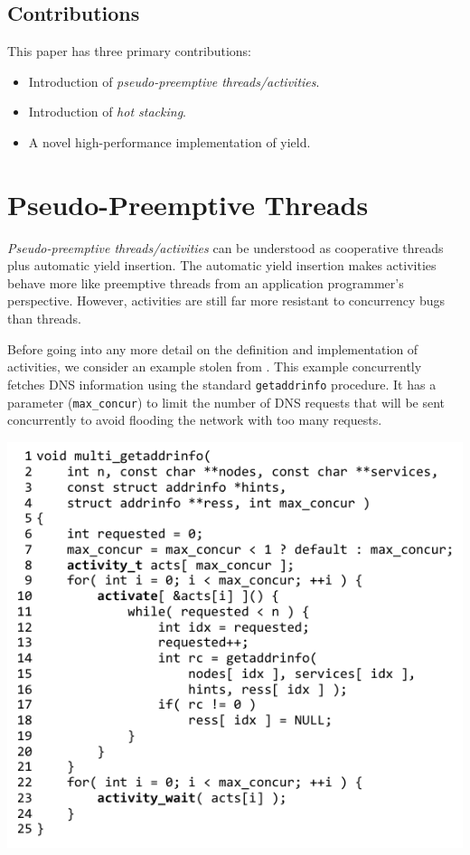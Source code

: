 \documentclass[10pt,preprint]{sigplanconf}
\begin{document}

\subsection{Contributions}

This paper has three primary contributions:

\begin{itemize}
\item Introduction of \emph{pseudo-preemptive threads/activities}.
\item Introduction of \emph{hot stacking}.
\item A novel high-performance implementation of yield.
\end{itemize}

\section{Pseudo-Preemptive Threads}

\emph{Pseudo-preemptive threads\slash activities} can be understood as cooperative threads plus automatic yield insertion.
The automatic yield insertion makes activities behave more like preemptive threads from an application programmer's perspective.
However, activities are still far more resistant to concurrency bugs than threads.

Before going into any more detail on the definition and implementation of activities, we consider an example stolen from \cite{Krohn2007}.
This example concurrently fetches DNS information using the standard \texttt{getaddrinfo} procedure.
It has a parameter (\texttt{max\_concur}) to limit the number of DNS requests that will be sent concurrently to avoid flooding the network with too many requests.

\hspace{-0.5cm}
\includegraphics{multi_getaddrinfo}
\end{document}
